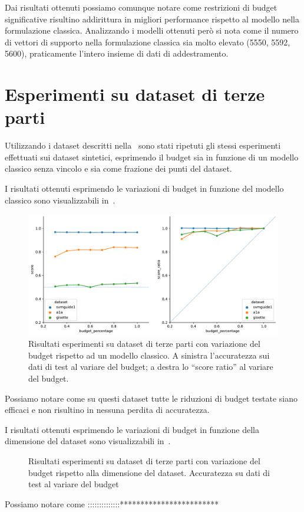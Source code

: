 Dai risultati ottenuti possiamo comunque notare come restrizioni di budget significative risultino addirittura in migliori performance rispetto al modello nella formulazione classica. 
Analizzando i modelli ottenuti però si nota come il numero di vettori di supporto nella formulazione classica sia molto elevato (5550, 5592, 5600), praticamente l'intero insieme di dati di addestramento.


\section{Esperimenti su dataset di terze parti}\label{sec:exp:real_ds}
Utilizzando i dataset descritti nella~ sono stati ripetuti gli stessi esperimenti effettuati sui dataset sintetici, esprimendo il budget sia in funzione di un modello classico senza vincolo e sia come frazione dei punti del dataset.

I risultati ottenuti esprimendo le variazioni di budget in funzione del modello classico sono visualizzabili in~.
\begin{figure}
    \centering
    \includegraphics[width=1\linewidth]{img//TP/tp_old_strategy.pdf}
    \caption{Risultati esperimenti su dataset di terze parti con variazione del budget rispetto ad un modello classico. A sinistra l'accuratezza sui dati di test al variare del budget; a destra lo ``score ratio'' al variare del budget.}
    \label{fig:TP_old_strategy}
\end{figure}
Possiamo notare come su questi dataset tutte le riduzioni di budget testate siano efficaci e non risultino in nessuna perdita di accuratezza.

I risultati ottenuti esprimendo le variazioni di budget in funzione della dimensione del dataset sono visualizzabili in~.
\begin{figure}
    \centering
    \caption{Risultati esperimenti su dataset di terze parti con variazione del budget rispetto alla dimensione del dataset. Accuratezza su dati di test al variare del budget}
    \label{fig:TP_new_strategy}
\end{figure}
Possiamo notare come ::::::::::::::************************

